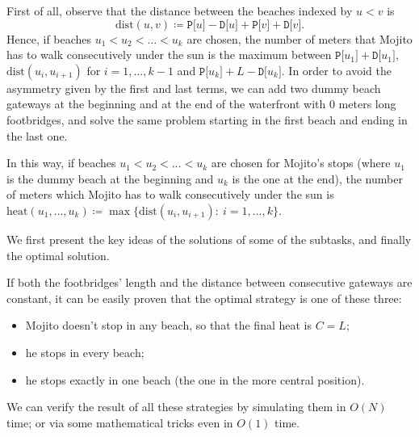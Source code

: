 \setcounter{figure}{0}


\pagecolor{backcolor}


\newcommand{\dist}{\ensuremath{\mathrm{dist}}} 
\newcommand{\calura}{\ensuremath{\mathrm{heat}}} 
\newtheorem*{lemma}{Lemma}

\Solution

First of all, observe that the distance between the beaches indexed by $u<v$ is
\[
\dist (u,v) \coloneqq \texttt{P[}u \texttt{]} - \texttt{D[}u\texttt{]} + \texttt{P[}v\texttt{]}+\texttt{D[}v\texttt{]}.
\]
Hence, if beaches $u_1 < u_2 < \ldots < u_k$ are chosen, the number of meters that Mojito has to walk consecutively under the sun is the maximum between $\texttt{P[}u_1 \texttt{]} + \texttt{D[}u_1 \texttt{]} $, $\dist(u_i,u_{i+1})$ for $i=1,\ldots, k-1$ and $\texttt{P[}u_k\texttt{]}+L-\texttt{D[}u_k\texttt{]}$.
In order to avoid the asymmetry given by the first and last terms, we can add two dummy beach gateways at the beginning and at the end of the waterfront with 0 meters long footbridges, and solve the same problem starting in the first beach and ending in the last one.

In this way, if beaches $u_1 < u_2 < \ldots < u_k$ are chosen for Mojito's stops (where $u_1$ is the dummy beach at the beginning and $u_k$ is the one at the end), the number of meters which Mojito has to walk consecutively under the sun is $\calura(u_1,\ldots,u_k) \coloneqq \max \{ \dist(u_i,u_{i+1}): \ i=1,\ldots,k\}$.

We first present the key ideas of the solutions of some of the subtasks, and finally the optimal solution.


\Costante

If both the footbridges' length and the distance between consecutive gateways are constant, it can be easily proven that the optimal strategy is one of these three:
\begin{itemize}
 \item Mojito doesn't stop in any beach, so that the final heat is $C=L$;
 \item he stops in every beach;
 \item he stops exactly in one beach (the one in the more central position).
\end{itemize}
We can verify the result of all these strategies by simulating them in $O(N)$ time; or via some mathematical tricks even in $O(1)$ time.

